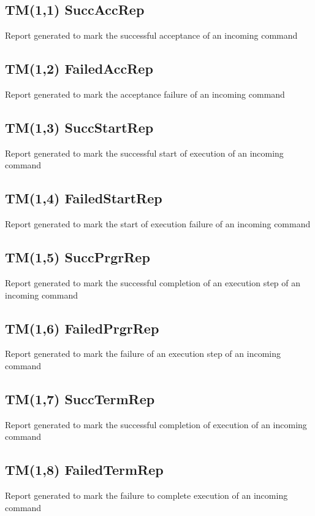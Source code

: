 \pagebreak
\subsection{TM(1,1) SuccAccRep}
Report generated to mark the successful acceptance of an incoming command

\pagebreak
\subsection{TM(1,2) FailedAccRep}
Report generated to mark the acceptance failure of an incoming command

\pagebreak
\subsection{TM(1,3) SuccStartRep}
Report generated to mark the successful start of execution of an incoming command

\pagebreak
\subsection{TM(1,4) FailedStartRep}
Report generated to mark the start of execution failure of an incoming command

\pagebreak
\subsection{TM(1,5) SuccPrgrRep}
Report generated to mark the successful completion of an execution step of an incoming command

\pagebreak
\subsection{TM(1,6) FailedPrgrRep}
Report generated to mark the failure of an execution step of an incoming command

\pagebreak
\subsection{TM(1,7) SuccTermRep}
Report generated to mark the successful completion of execution of an incoming command

\pagebreak
\subsection{TM(1,8) FailedTermRep}
Report generated to mark the failure to complete execution of an incoming command


